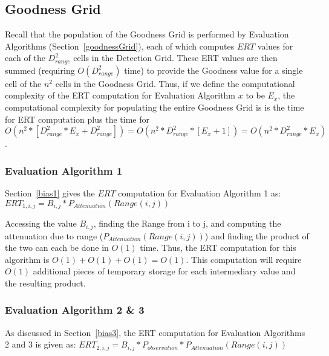 \subsection{Goodness Grid}
Recall that the population of the Goodness Grid is performed by Evaluation Algorithms (Section~\ref{goodnessGrid}), each of which computes $ERT$ values for each of the $D_{range}^2$ cells in the Detection Grid.  These ERT values are then summed (requiring $O(D_{range}^2)$  time) to provide the Goodness value for a single cell of the $n^2$ cells in the Goodness Grid.  Thus, if we define the computational complexity of the ERT computation for Evaluation Algorithm $x$ to be $E_x$, the computational complexity for populating the entire Goodness Grid is is the time for ERT computation plus the time for  $O(n^2 * [D_{range}^2* E_x + D_{range}^2]) = O(n^2 * D_{range}^2 * [E_x + 1]) = O(n^2 * D_{range}^2 * E_x)$. 


\subsubsection{Evaluation Algorithm 1}
\label{bigObias1}
Section~\ref{bias1} gives the $ERT$ computation for Evaluation Algorithm 1 as:\newline
$ERT_{1,i,j} = B_{i,j} * P_{Attenuation}(Range(i,j))$

Accessing the value $ B_{i,j}$, finding the Range from i to j, and computing the attenuation due to range ($P_{Attenuation}(Range(i,j))$) and finding the product of the two can each be done in $O(1)$ time.  Thus, the ERT computation for this algorithm is $O(1) + O(1) + O(1) = O(1)$.  This computation will require $O(1)$ additional pieces of temporary storage for each intermediary value and the resulting product.


\subsubsection{Evaluation Algorithm 2 \& 3}
\label{bigObias23}
As discussed in Section~\ref{bias3}, the ERT computation for Evaluation Algorithms 2 and 3 is given as:\newline
$ERT_{2,i,j} =  B_{i,j} * P_{observation} * P_{Attenuation}(Range(i,j))$\newline

